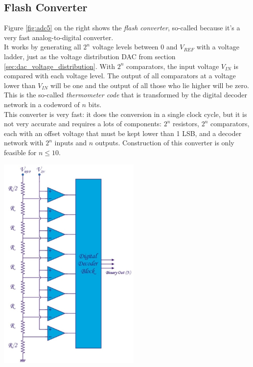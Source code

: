 \subsection{Flash Converter}
\label{sec:flash}
\begin{minipage}{.5\textwidth}
	Figure \ref{fig:adc5} on the right shows the \emph{flash converter}, so-called because it's a very fast analog-to-digital converter.\\
	It works by generating all $2^n$ voltage levels between $0$ and $V_{REF}$ with a voltage ladder, just as the voltage distribution DAC from section \ref{sec:dac_voltage_distribution}. With $2^n$ comparators, the input voltage $V_{IN}$ is compared with each voltage level. The output of all comparators at a voltage lower than $V_{IN}$ will be one and the output of all those who lie higher will be zero. This is the so-called \emph{thermometer code} that is transformed by the digital decoder network in a codeword of $n$ bits.\\
	This converter is very fast: it does the conversion in a single clock cycle, but it is not very accurate and requires a lots of components: $2^n$ resistors, $2^n$ comparators, each with an offset voltage that must be kept lower than 1 LSB, and a decoder network with $2^n$ inputs and $n$ outputs. Construction of this converter is only feasible for $n \le 10$.
\end{minipage}
\begin{minipage}{.5\textwidth}
	\centering
	\includegraphics[width=7cm]{figures/ch18/adc5.jpg}
	\label{fig:adc5}
\end{minipage}\\

